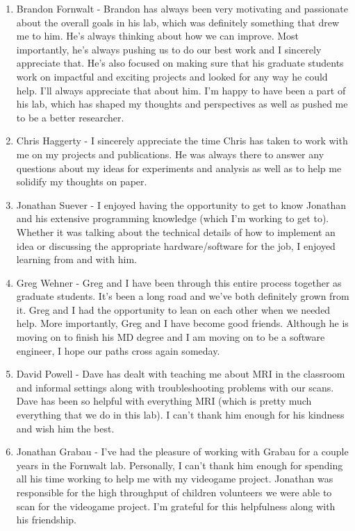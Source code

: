 \begin{enumerate}
	\item Brandon Fornwalt - Brandon has always been very motivating and passionate about the overall goals in his lab, which was definitely something that drew me to him. He's always thinking about how we can improve. Most importantly, he's always pushing us to do our best work and I sincerely appreciate that. He's also focused on making sure that his graduate students work on impactful and exciting projects and looked for any way he could help. I'll always appreciate that about him. I'm happy to have been a part of his lab, which has shaped my thoughts and perspectives as well as pushed me to be a better researcher.
	\item Chris Haggerty - I sincerely appreciate the time Chris has taken to work with me on my projects and publications. He was always there to answer any questions about my ideas for experiments and analysis as well as to help me solidify my thoughts on paper.
	\item Jonathan Suever - I enjoyed having the opportunity to get to know Jonathan and his extensive programming knowledge (which I'm working to get to). Whether it was talking about the technical details of how to implement an idea or discussing the appropriate hardware/software for the job, I enjoyed learning from and with him.
	\item Greg Wehner - Greg and I have been through this entire process together as graduate students. It's been a long road and we've both definitely grown from it. Greg and I had the opportunity to lean on each other when we needed help. More importantly, Greg and I have become good friends. Although he is moving on to finish his MD degree and I am moving on to be a software engineer, I hope our paths cross again someday.
	\item David Powell - Dave has dealt with teaching me about MRI in the classroom and informal settings along with troubleshooting problems with our scans. Dave has been so helpful with everything MRI (which is pretty much everything that we do in this lab). I can't thank him enough for his kindness and wish him the best.
	\item Jonathan Grabau - I've had the pleasure of working with Grabau for a couple years in the Fornwalt lab. Personally, I can't thank him enough for spending all his time working to help me with my videogame project. Jonathan was responsible for the high throughput of children volunteers we were able to scan for the videogame project. I'm grateful for this helpfulness along with his friendship.

\end{enumerate}
